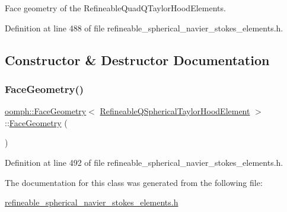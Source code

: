 Face geometry of the Refineable\+Quad\+Q\+Taylor\+Hood\+Elements. 

Definition at line 488 of file refineable\+\_\+spherical\+\_\+navier\+\_\+stokes\+\_\+elements.\+h.



\subsection{Constructor \& Destructor Documentation}
\mbox{\label{classoomph_1_1FaceGeometry_3_01RefineableQSphericalTaylorHoodElement_01_4_a7782322a118e0e9d6080cefa5dcc04ba}} 
\subsubsection{\texorpdfstring{Face\+Geometry()}{FaceGeometry()}}
{\footnotesize\ttfamily \hyperlink{classoomph_1_1FaceGeometry}{oomph\+::\+Face\+Geometry}$<$ \hyperlink{classoomph_1_1RefineableQSphericalTaylorHoodElement}{Refineable\+Q\+Spherical\+Taylor\+Hood\+Element} $>$\+::\hyperlink{classoomph_1_1FaceGeometry}{Face\+Geometry} (\begin{DoxyParamCaption}{ }\end{DoxyParamCaption})\hspace{0.3cm}{\ttfamily [inline]}}



Definition at line 492 of file refineable\+\_\+spherical\+\_\+navier\+\_\+stokes\+\_\+elements.\+h.



The documentation for this class was generated from the following file\+:\begin{DoxyCompactItemize}
\item 
\hyperlink{refineable__spherical__navier__stokes__elements_8h}{refineable\+\_\+spherical\+\_\+navier\+\_\+stokes\+\_\+elements.\+h}\end{DoxyCompactItemize}
